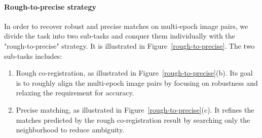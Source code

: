\paragraph{Rough-to-precise strategy}
In order to recover robust and precise matches on multi-epoch image pairs, we divide the task into two sub-tasks and conquer them individually with the "rough-to-precise" strategy. It is illustrated in Figure~\ref{rough-to-precise}. The two sub-tasks includes:\\
\begin{enumerate}
	\item Rough co-registration, as illustrated in Figure~\ref{rough-to-precise}(b). Its goal is to roughly align the multi-epoch image pairs by focusing on robustness and relaxing the requirement for accuracy.
	\item Precise matching, as illustrated in Figure~\ref{rough-to-precise}(c). It refines the matches predicted by the rough co-registration result by searching only the neighborhood to reduce ambiguity.
\end{enumerate}
